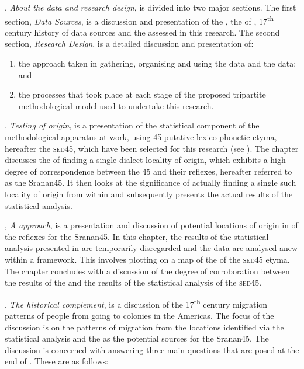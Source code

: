 , \emph{About the data and research design}, is divided into two major sections. The first section, \emph{Data Sources}, is a discussion and presentation of the , the  of , 17\textsuperscript{th} century history of  data sources and the  assessed in this research. The second section, \emph{Research Design}, is a detailed discussion and presentation of:

\begin{enumerate}
\renewcommand{\labelenumi}{\alph{enumi}.} 
\item the approach taken in gathering, organising and using the   data and the  data; and
\item the processes that took place at each stage of the proposed tripartite methodological model used to undertake this research.
\end{enumerate}

, \emph{Testing  of origin}, is a presentation of the statistical component of the methodological apparatus at work, using 45 putative lexico-pho\-net\-ic  etyma, hereafter the \textsc{sed45}, which have been selected for this research (see ). The chapter discusses the  of finding a single dialect locality of origin, which exhibits a high degree of correspondence between the 45  and their  reflexes, hereafter referred to as the Sranan45. It then looks at the significance of actually finding a single such locality of origin from within  and subsequently presents the actual results of the statistical analysis.

, \emph{A  approach}, is a presentation and discussion of potential locations of origin in  of the  reflexes for the Sranan45. In this chapter, the results of the statistical analysis presented in  are temporarily disregarded and the data are analysed anew within a  framework. This involves plotting on a map of  the  of the \textsc{sed45} etyma. The chapter concludes with a discussion of the degree of corroboration between the results of the  and the results of the statistical analysis of the  \textsc{sed45}.

, \emph{The historical complement}, is a discussion of the 17\textsuperscript{th} century migration patterns of people from  going to  colonies in the Americas. The focus of the discussion is on the patterns of migration from the locations identified via the statistical analysis and the  as the potential sources for the Sranan45. The discussion is concerned with answering three main questions that are posed at the end of . These are as follows:

